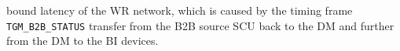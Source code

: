 bound latency of the WR network, which is caused by the timing frame \verb|TGM_B2B_STATUS| transfer from the B2B source SCU back to the DM and further from the DM to the BI devices.


